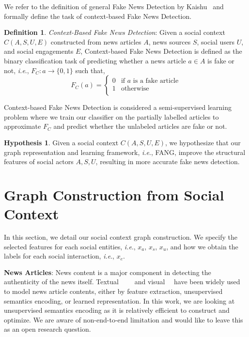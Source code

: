 \documentclass[fyp]{socreport}
\theoremstyle{definition}
\newtheorem{definition}{Definition}[section]
\theoremstyle{hypothesis}
\newtheorem{hypothesis}{Hypothesis}[section]
\begin{document}
We refer to the definition of general Fake News Detection by Kaishu~\cite{shu2017fake} and formally define the task of context-based Fake News Detection.
\begin{definition}{\textit{Context-Based Fake News Detection}}: Given a social context $C(A,S,U,E)$ constructed from news articles $A$, news sources $S$, social users $U$, and social engagements $E$,
Context-based Fake News Detection is defined as the binary classification task of predicting whether a news article $a\in A$ is fake or not, \textit{i.e}.,  $F_C : a \rightarrow \{0,1\}$ such that,
\[  F_C(a) = \left\{
\begin{array}{ll}
      0 & \textrm{if } a \textrm{ is a fake article} \\
      1 & \textrm{otherwise} \\
\end{array} 
\right. \]
\end{definition}
Context-based Fake News Detection is considered a semi-supervised learning problem where we train our classifier on the partially labelled articles to approximate $F_C$ and predict whether the unlabeled articles are fake or not.
\begin{hypothesis}Given a social context $C(A,S,U,E)$, we hypothesize that our graph representation and learning framework, \textit{i.e}., FANG, improve the structural features of social actors $A,S,U$, resulting in more accurate fake news detection.
\end{hypothesis}

\section{Graph Construction from Social Context}
\label{sec:graph_construction}
In this section, 
we detail our social context graph construction. We specify the selected features for each social entities, \textit{i.e}., $x_a$, $x_s$, $x_u$, and how we obtain the labels for each social interaction, \textit{i.e}., $x_e$.

\textbf{News Articles}: News content is a major component in detecting the authenticity of the news itself. Textual~\cite{castillo2011information}~\cite{yang2012automatic}~\cite{shu2019beyond}~\cite{popat2018credeye} and visual~\cite{wang2018eann}~\cite{khattar2019mvae} have been widely used to model news article contents, either by feature extraction, unsupervised semantics encoding, or learned representation. In this work, we are looking at unsupervised semantics encoding as it is relatively efficient to construct and optimize. We are aware of non-end-to-end limitation and would like to leave this as an open research question.
\end{document}
